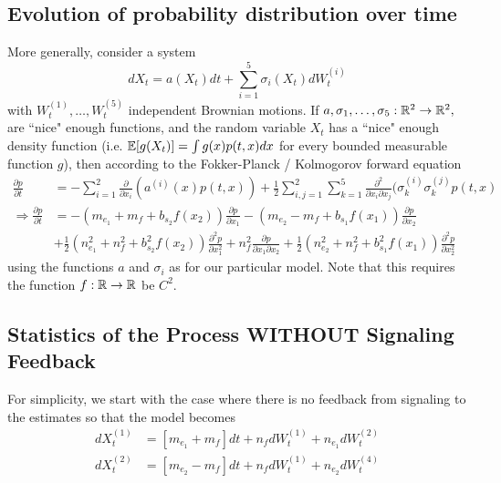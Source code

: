 \documentclass{article}
\begin{document}
\subsection{Evolution of probability distribution over time }
More generally, consider a system
$$ dX_t=a(X_t)dt+\sum_{i=1}^5\sigma_i(X_t)dW_t^{(i)}$$
with $W_t^{(1)},\dots,W_t^{(5)}$ independent Brownian motions.
If $a,\sigma_1,\dots,\sigma_5:{\mathbb{R}}^2\to{\mathbb{R}}^2,$ are ``nice" enough functions, and the random variable $X_t$ has a ``nice" enough density function (i.e. ${\mathbb{E}}[g(X_t)]=\int g(x)p(t,x)dx$ for every bounded measurable function $g$), then according to the Fokker-Planck / Kolmogorov forward equation
\begin{align*}
\frac{\partial p}{\partial t}&=-\sum_{i=1}^2\frac{\partial}{\partial x_i}(a^{(i)}(x)p(t,x))+\frac{1}{2}\sum_{i,j=1}^2\sum_{k=1}^5\frac{\partial^2}{\partial x_i\partial x_j}(\sigma_k^{(i)}\sigma_k^{(j)}p(t,x)
\\ \Rightarrow \frac{\partial p}{\partial t}&=-(m_{e_1}+m_f+b_{s_2}f(x_2))\frac{\partial p}{\partial x_1}-(m_{e_2}-m_f+b_{s_1}f(x_1))\frac{\partial p}{\partial x_2}
\\&+\frac{1}{2}(n_{e_1}^2+n_f^2+b_{s_2}^2f(x_2))\frac{\partial^2 p}{\partial x_1^2}+n_f^2\frac{\partial p}{\partial x_1\partial x_2}+\frac{1}{2}(n_{e_2}^2+n_f^2+b_{s_1}^2f(x_1))\frac{\partial^2 p}{\partial x_2^2}
\end{align*}
using the functions $a$ and $\sigma_i$ as for our particular model.  Note that this requires the function $f:{\mathbb{R}}\to{\mathbb{R}}$ be $C^2$.

\subsection{Statistics of the Process WITHOUT Signaling Feedback }
%
For simplicity, we start with the case where there is no feedback from signaling to the estimates so that the model becomes
\begin{align*}
dX_t^{(1)}&=\left[m_{e_1}+m_f\right]dt+n_fdW_t^{(1)}+n_{e_1}dW_t^{(2)}
\\ dX_t^{(2)}&=\left[m_{e_2}-m_f\right]dt+n_fdW_t^{(1)}+n_{e_2}dW_t^{(4)}
\end{align*}
\end{document}
